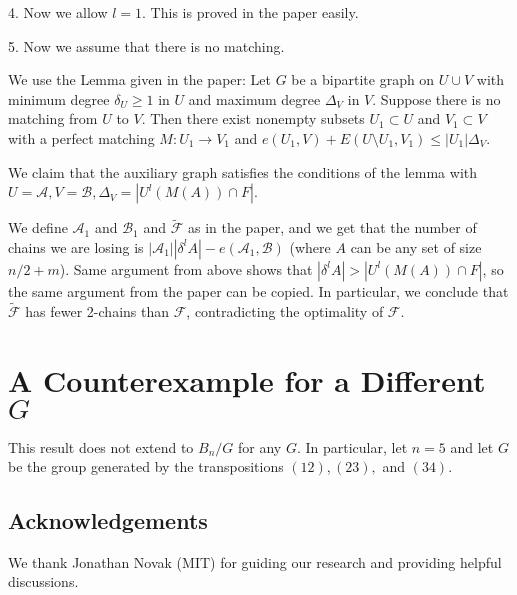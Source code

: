 \documentclass[12pt]{article}
\theoremstyle{plain}
\theoremstyle{definition}
\theoremstyle{remark}
\newcommand{\F}{\mathcal{F}}
\newcommand{\A}{\mathcal{A}}
\newcommand{\B}{\mathcal{B}}
\begin{document}
4. Now we allow $l = 1$. This is proved in the paper easily. 

5. Now we assume that there is no matching.

We use the Lemma given in the paper: Let $G$ be a bipartite graph on $U \cup V$ with minimum degree $\delta_U \geq 1$ in $U$ and maximum degree $\Delta_V$ in $V$. Suppose there is no matching from $U$ to $V$. Then there exist nonempty subsets $U_1 \subset U$ and $V_1 \subset V$ with a perfect matching $M: U_1 \to V_1$ and $e(U_1,V) + E(U \setminus U_1,V_1) \leq |U_1|\Delta_V$.

We claim that the auxiliary graph satisfies the conditions of the lemma with $U = \A, V = \B, \Delta_V = |U^l(M(A)) \cap F|$.

We define $\A_1$ and $\B_1$ and $\tilde{\F}$ as in the paper, and we get that the number of chains we are losing is $|\A_1||\delta^l A| - e(\A_1,\B)$ (where $A$ can be any set of size $n/2 + m$). Same argument from above shows that $|\delta^l A| > |U^l(M(A)) \cap F|$, so the same argument from the paper can be copied. In particular, we conclude that $\tilde{\F}$ has fewer 2-chains than $\F$, contradicting the optimality of $\F$.


\section{A Counterexample for a Different $G$}

This result does not extend to $B_n / G$ for any $G$. In particular, let $n = 5$ and let $G$ be the group generated by the transpositions $(12), (23),$ and $(34)$.

\subsection*{Acknowledgements}
We thank Jonathan Novak (MIT) for guiding our research and providing helpful discussions.

%  
%  

\begin{thebibliography}{10}


\end{thebibliography}
\end{document}
